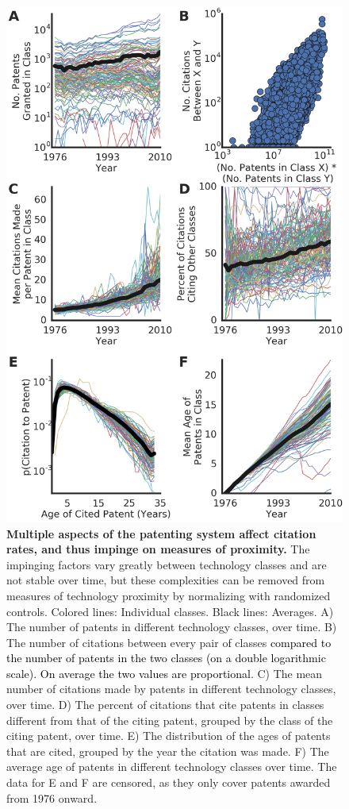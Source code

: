 \documentclass[]{svjour3}
\begin{document}
\begin{figure}[ht!]
\begin{center}
\includegraphics[width=.75\textwidth]{figs/Impinging_Factors_IPC.png} 
\end{center}
\caption{\textbf{Multiple aspects of the patenting system affect citation rates, and thus impinge on measures of proximity.} The impinging factors vary greatly between technology classes and are not stable over time, but these complexities can be removed from measures of technology proximity by normalizing with randomized controls. Colored lines: Individual classes. Black lines: Averages.
A) The number of patents in different technology classes, over time.
B) The number of citations between every pair of classes \textcolor{black}{compared to the number of patents in the two classes (on a double logarithmic scale). On average the two values are proportional.}
C) The mean number of citations made by patents in different technology classes, over time. 
D) The percent of citations that cite patents in classes different from that of the citing patent, grouped by the class of the citing patent, over time.
E) The distribution of the ages of patents that are cited, grouped by the year the citation was made.
F) The average age of patents in different technology classes over time. The data for E and F are censored, as they only cover patents awarded from 1976 onward. 
}\label{Impinging_Factors}
\end{figure}
\end{document}
